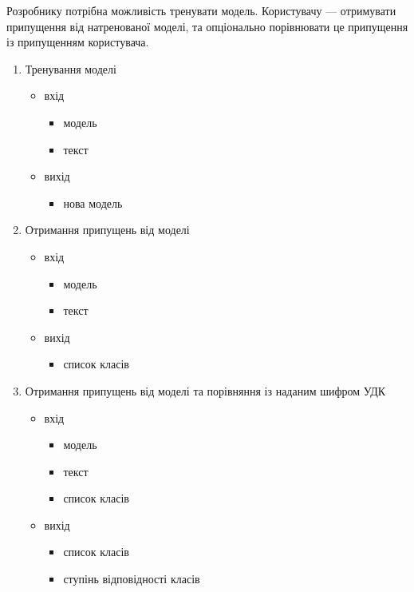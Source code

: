 \documentclass[14pt]{extarticle}
\begin{document}
  Розробнику потрібна можливість тренувати модель.
  Користувачу --- отримувати припущення від натренованої моделі,
  та опціонально порівнювати це припущення із припущенням користувача.
  \begin{enumerate}[labelindent=\dimexpr\parindent*2\relax, leftmargin=*]
    \item Тренування моделі
      \begin{itemize}[labelindent=\dimexpr\parindent\relax, leftmargin=*]
        \item вхід
          \begin{itemize}[labelindent=\dimexpr\parindent\relax, leftmargin=*]
            \item модель
            \item текст
          \end{itemize}
        \item вихід
          \begin{itemize}[labelindent=\dimexpr\parindent\relax, leftmargin=*]
            \item нова модель
          \end{itemize}
      \end{itemize}
    \item Отримання припущень від моделі
      \begin{itemize}[labelindent=\dimexpr\parindent\relax, leftmargin=*]
        \item вхід
          \begin{itemize}[labelindent=\dimexpr\parindent\relax, leftmargin=*]
            \item модель
            \item текст
          \end{itemize}
        \item вихід
          \begin{itemize}[labelindent=\dimexpr\parindent\relax, leftmargin=*]
            \item список класів
          \end{itemize}
      \end{itemize}
    \item Отримання припущень від моделі та порівняння із наданим шифром УДК
      \begin{itemize}[labelindent=\dimexpr\parindent\relax, leftmargin=*]
        \item вхід
          \begin{itemize}[labelindent=\dimexpr\parindent\relax, leftmargin=*]
            \item модель
            \item текст
            \item список класів
          \end{itemize}
        \item вихід
          \begin{itemize}[labelindent=\dimexpr\parindent\relax, leftmargin=*]
            \item список класів
            \item ступінь відповідності класів
          \end{itemize}
      \end{itemize}
  \end{enumerate}
\end{document}
